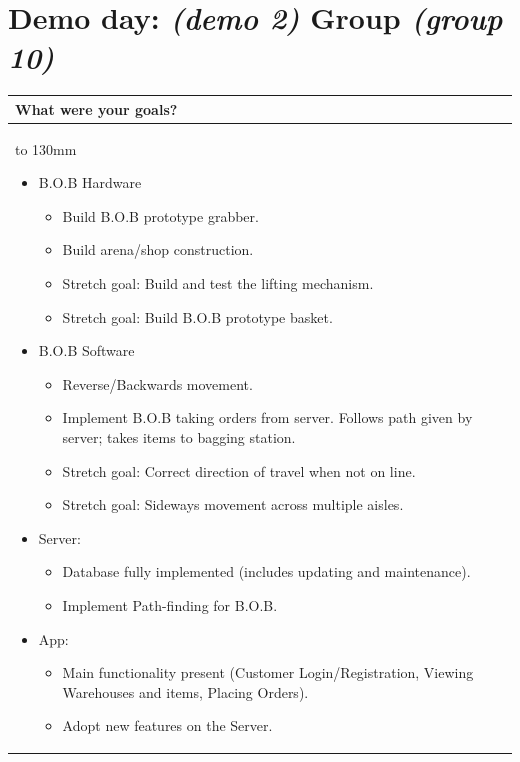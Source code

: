 \documentclass[a4paper]{article}
\newcommand{\colWidth}{141mm}
\begin{document}
 
\section*{Demo day: \textit{(demo 2)} Group \textit{(group 10)}}


\begin{center}
\begin{tabular}{|p{\colWidth}|}
	\hline
	\cellcolor{blue!25}\large
	\textbf{What were your goals?}
	\\ \hline
	\vtop to 130mm{
\begin{itemize}
    \item B.O.B Hardware
    \begin{itemize}
         \item Build B.O.B prototype grabber. 
         \item Build arena/shop construction. 
         \item Stretch goal: Build and test the lifting mechanism.
         \item Stretch goal: Build B.O.B prototype basket.
    \end{itemize}
    \item B.O.B Software
    \begin{itemize} 
        \item Reverse/Backwards movement.
        \item Implement B.O.B taking orders from server. Follows path given by server; takes items to bagging station.
        \item Stretch goal: Correct direction of travel when not on line.
        \item Stretch goal: Sideways movement across multiple aisles. 
    \end{itemize}
    \item Server: 
    \begin{itemize}
        \item Database fully implemented (includes updating and maintenance). 
        \item Implement Path-finding for B.O.B.
    \end{itemize}
    \item App:
    \begin{itemize}
        \item Main functionality present (Customer Login/Registration, Viewing Warehouses and items, Placing Orders).
        \item Adopt new features on the Server.

\end{itemize}
\end{itemize}}
\end{tabular}
\end{center}
\end{document}

